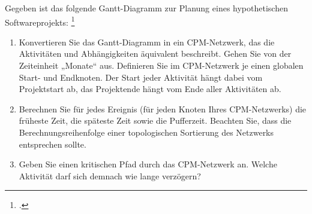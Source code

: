 \documentclass{bschlangaul-aufgabe}
\begin{document}

Gegeben ist das folgende Gantt-Diagramm zur Planung eines
hypothetischen Softwareprojekts:
\footcite[Thema 2 Teilaufgabe 2 Aufgabe 1]{examen:66116:2017:09}

\begin{enumerate}


\item Konvertieren Sie das Gantt-Diagramm in ein CPM-Netzwerk, das die
Aktivitäten und Abhängigkeiten äquivalent beschreibt. Gehen Sie von der
Zeiteinheit „Monate“ aus. Definieren Sie im CPM-Netzwerk je einen
globalen Start- und Endknoten. Der Start jeder Aktivität hängt dabei vom
Projektstart ab, das Projektende hängt vom Ende aller Aktivitäten ab.


\item Berechnen Sie für jedes Ereignis (\dh für jeden Knoten Ihres
CPM-Netzwerks) die früheste Zeit, die späteste Zeit sowie die
Pufferzeit. Beachten Sie, dass die Berechnungsreihenfolge einer
topologischen Sortierung des Netzwerks entsprechen sollte.


\item Geben Sie einen kritischen Pfad durch das CPM-Netzwerk an.
Welche Aktivität darf sich demnach wie lange verzögern?
\end{enumerate}
\end{document}
